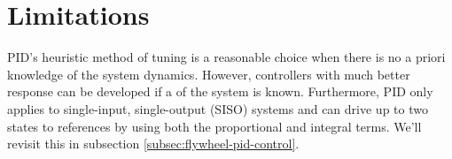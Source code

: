 \section{Limitations}

PID's heuristic method of tuning is a reasonable choice when there is no a
priori knowledge of the \gls{system} dynamics. However, controllers with much
better response can be developed if a  of the
\gls{system} is known. Furthermore, PID only applies to single-input,
single-output (SISO) \glspl{system} and can drive up to two \glspl{state} to
\glspl{reference} by using both the proportional and integral terms. We'll
revisit this in subsection \ref{subsec:flywheel-pid-control}.
